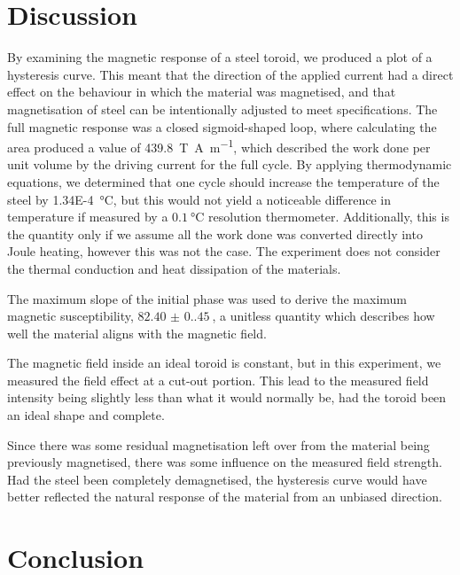 \section{Discussion}


By examining the magnetic response of a steel toroid, we produced a plot of a hysteresis curve.
This meant that the direction of the applied current had a direct effect on the behaviour in which the material was
magnetised, and that magnetisation of steel can be intentionally adjusted to meet specifications.
The full magnetic response was a closed sigmoid-shaped loop, where calculating the area produced a value of
\qty{439.8}{\tesla\ampere\per\meter}, which described the work done per unit volume by the driving current for the
full cycle.
By applying thermodynamic equations, we determined that one cycle should increase the temperature of the
steel by \qty{1.34E-4}{\celsius}, but this would not yield a noticeable difference in temperature if
measured by a $\qty{0.1}{\celsius}$ resolution thermometer.
Additionally, this is the quantity only if we assume all the work done was converted directly
into
Joule heating, however this was not the case.
The experiment does not consider the thermal conduction and heat dissipation of the materials.

The maximum slope of the initial phase was used to derive the maximum magnetic susceptibility, $\qty{82.40(0.45)}{}$, a unitless quantity which describes how well the material aligns with the magnetic field.

The magnetic field inside an ideal toroid is constant, but in this experiment, we measured the field effect at a
cut-out portion.
This lead to the measured field intensity being slightly less than what it would normally be, had the toroid been an
ideal shape and complete.

Since there was some residual magnetisation left over from the material being previously magnetised, there was some
influence on the measured field strength.
Had the steel been completely demagnetised, the hysteresis curve would have better reflected the natural response of
the
material from an unbiased direction.


\section{Conclusion}

